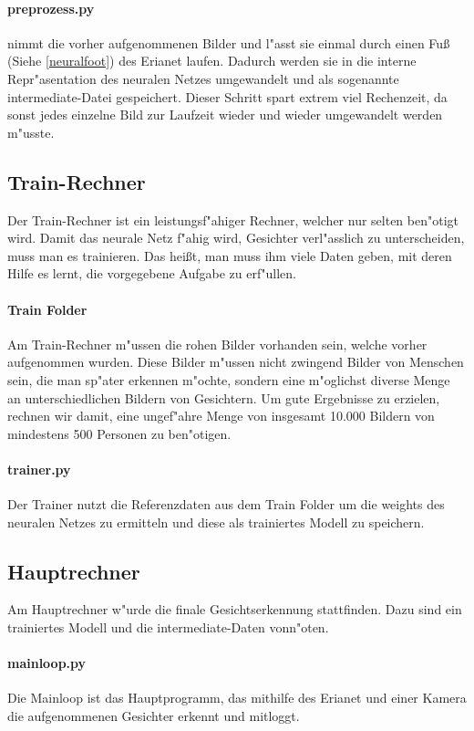 \documentclass[12pt]{article}
\begin{document}
\paragraph{preprozess.py}
nimmt die vorher aufgenommenen Bilder und l"asst sie einmal 
durch einen Fu{\ss} (Siehe \ref{neuralfoot}) des Erianet laufen. Dadurch
werden sie in die interne Repr"asentation des neuralen Netzes 
umgewandelt und als sogenannte intermediate-Datei gespeichert.
Dieser Schritt spart extrem viel Rechenzeit, da sonst
jedes einzelne Bild zur Laufzeit wieder und wieder 
umgewandelt werden m"usste.
\subsection{Train-Rechner}
Der Train-Rechner ist ein leistungsf"ahiger Rechner, welcher nur selten
ben"otigt wird. Damit das neurale Netz f"ahig wird, Gesichter verl"asslich
zu unterscheiden, muss man es trainieren. Das hei{\ss}t, man muss ihm viele
Daten geben, mit deren Hilfe es lernt, die vorgegebene Aufgabe zu erf"ullen.
\paragraph{Train Folder} Am Train-Rechner m"ussen die rohen
Bilder vorhanden sein, welche vorher aufgenommen wurden.
Diese Bilder m"ussen nicht zwingend Bilder von Menschen sein,
die man sp"ater erkennen m"ochte, sondern eine m"oglichst diverse
Menge an unterschiedlichen Bildern von Gesichtern. Um gute Ergebnisse
zu erzielen, rechnen wir damit, eine ungef"ahre Menge von insgesamt
10.000 Bildern von mindestens 500 Personen zu ben"otigen.
\paragraph{trainer.py}
Der Trainer nutzt die Referenzdaten aus dem Train Folder 
um die weights des neuralen Netzes zu ermitteln und diese
als trainiertes Modell zu speichern.
\subsection{Hauptrechner}
Am Hauptrechner w"urde die finale Gesichtserkennung stattfinden.
Dazu sind ein trainiertes Modell und die intermediate-Daten vonn"oten.
\paragraph{mainloop.py}
Die Mainloop ist das Hauptprogramm, das mithilfe des Erianet und einer Kamera
die aufgenommenen Gesichter erkennt und mitloggt.
\end{document}
